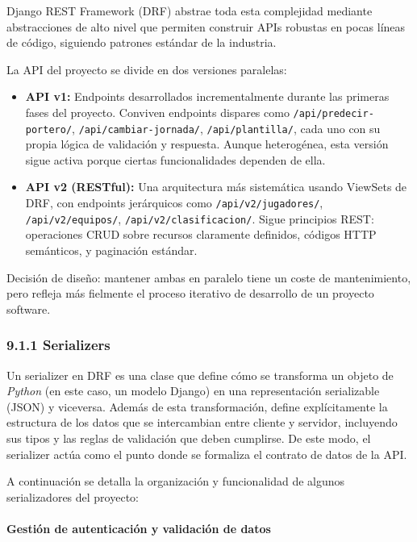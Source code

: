 Django REST Framework (DRF) abstrae toda esta complejidad mediante abstracciones de alto nivel
que permiten construir APIs robustas en pocas líneas de código, siguiendo patrones estándar
de la industria.
 
La API del proyecto se divide en dos versiones paralelas:
 
\begin{itemize}
\item \textbf{API v1:} Endpoints desarrollados incrementalmente durante las primeras fases del proyecto. Conviven endpoints dispares como \texttt{/api/predecir-portero/}, \texttt{/api/cambiar-jornada/}, \texttt{/api/plantilla/}, cada uno con su propia lógica de validación y respuesta. Aunque heterogénea, esta versión sigue activa porque ciertas funcionalidades dependen de ella.
 
\item \textbf{API v2 (RESTful):} Una arquitectura más sistemática usando ViewSets de DRF, con endpoints jerárquicos como \texttt{/api/v2/jugadores/}, \texttt{/api/v2/equipos/}, \texttt{/api/v2/clasificacion/}. Sigue principios REST: operaciones CRUD sobre recursos claramente definidos, códigos HTTP semánticos, y paginación estándar.
\end{itemize}
 
Decisión de diseño: mantener ambas en paralelo tiene un coste de mantenimiento,
pero refleja más fielmente el proceso iterativo de desarrollo de un proyecto software.
 
\subsubsection{9.1.1 Serializers}
 
Un serializer en DRF es una clase que define cómo se transforma un objeto de \textit{Python}
(en este caso, un modelo Django) en una representación serializable (JSON) y
viceversa. Además de esta transformación, define explícitamente la estructura de
los datos que se intercambian entre cliente y servidor, incluyendo sus tipos y
las reglas de validación que deben cumplirse. De este modo, el serializer actúa
como el punto donde se formaliza el contrato de datos de la API.
 
A continuación se detalla la organización y funcionalidad de algunos serializadores del proyecto:
 
\paragraph{Gestión de autenticación y validación de datos}
 
